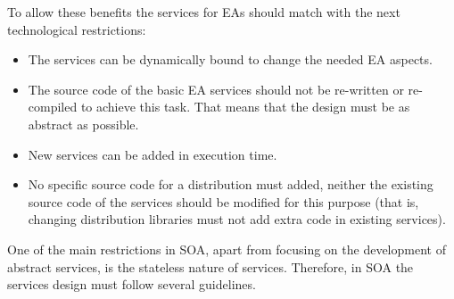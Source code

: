 To allow these benefits the services for EAs should match with the next technological
restrictions: %

\begin{itemize}
\item The services can be dynamically bound to change the needed EA aspects. %
\item The source code of  the basic EA services should not be  re-written or re-compiled to achieve this task. That means that the design must be as abstract as possible. %
\item New services can be added in execution time. 
\item No specific source code for a distribution must added, neither  the existing source code of the services should be modified for this purpose (that is, changing distribution libraries must not add extra code in existing services). 
\end{itemize}








One of the main restrictions in SOA, %
 apart from focusing on the development of abstract services, is the
 stateless nature of services. Therefore, in SOA the services design
 must follow several guidelines. %

